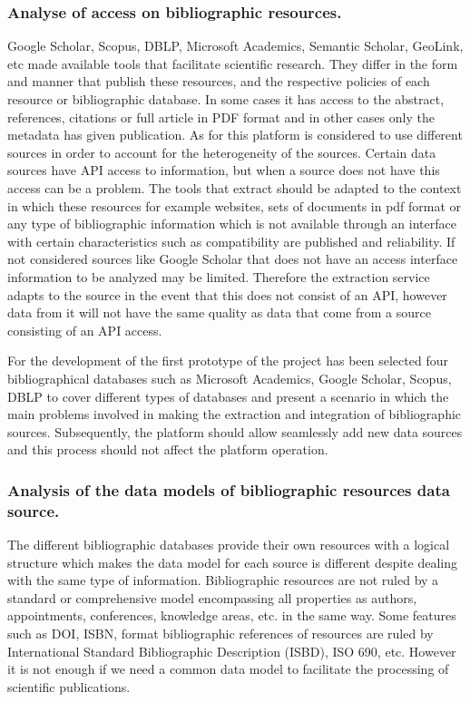 \documentclass[11pt]{article}
\begin{document}
\subsubsection{Analyse of access on bibliographic resources.}
Google Scholar, Scopus, DBLP, Microsoft Academics, Semantic Scholar, GeoLink, etc made available tools that facilitate scientific research. They differ in the form and manner that publish these resources, and the respective policies of each resource or bibliographic database. In some cases it has access to the abstract, references, citations or full article in PDF format and in other cases only the metadata has given publication. As for this platform is considered to use different sources in order to account for the heterogeneity of the sources.
Certain data sources have API access to information, but when a source does not have this access can be a problem. The tools that extract should be adapted to the context in which these resources for example websites, sets of documents in pdf format or any type of bibliographic information which is not available through an interface with certain characteristics such as compatibility are published and reliability. If not considered sources like Google Scholar that does not have an access interface information to be analyzed may be limited. Therefore the extraction service adapts to the source in the event that this does not consist of an API, however data from it will not have the same quality as data that come from a source consisting of an API access.

For the development of the first prototype of the project has been selected four bibliographical databases such as Microsoft Academics, Google Scholar, Scopus, DBLP  to cover different types of databases and present a scenario in which the main problems involved in making the extraction and integration of bibliographic sources. Subsequently, the platform should allow seamlessly add new data sources and this process should not affect the platform operation.

\subsubsection{Analysis of the data models of bibliographic resources data source.}

The different bibliographic databases provide their own resources with a logical structure which makes the data model for each source is different despite dealing with the same type of information. Bibliographic resources are not 
ruled by a standard or comprehensive model encompassing all properties as authors, appointments, conferences, knowledge areas, etc. in the same way. Some features such as DOI, ISBN, format bibliographic references of resources are ruled by International Standard Bibliographic Description (ISBD), ISO 690, etc. However it is not enough if we need a common data model to facilitate the processing of scientific publications.
\end{document}
